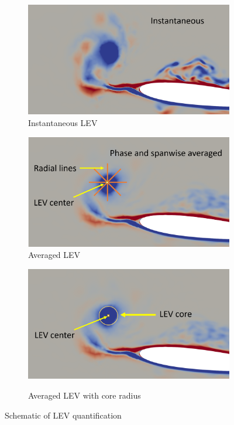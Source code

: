 \begin{figure}[H]
	\begin{subfigure}{0.5\textwidth}
		\includegraphics[width=1\textwidth]{figures/adapt_strat/LEV_tracking1.png}
		\caption{Instantaneous LEV}
		\label{fig:LEV_tracking1}
	\end{subfigure}
	\begin{subfigure}{0.5\textwidth}
	\includegraphics[width=1\textwidth]{figures/adapt_strat/LEV_tracking2.png}
	\caption{Averaged LEV}
	\label{fig:LEV_tracking2}
	\end{subfigure}

	\centering
	\begin{subfigure}{0.5\textwidth}
	\includegraphics[width=1\textwidth]{figures/adapt_strat/LEV_tracking3.png}
	\label{fig:LEV_tracking3}
    \caption{Averaged LEV with core radius}
\end{subfigure}
	
	\caption{Schematic of LEV quantification}
	\label{fig:LEV_tracking}
\end{figure}



